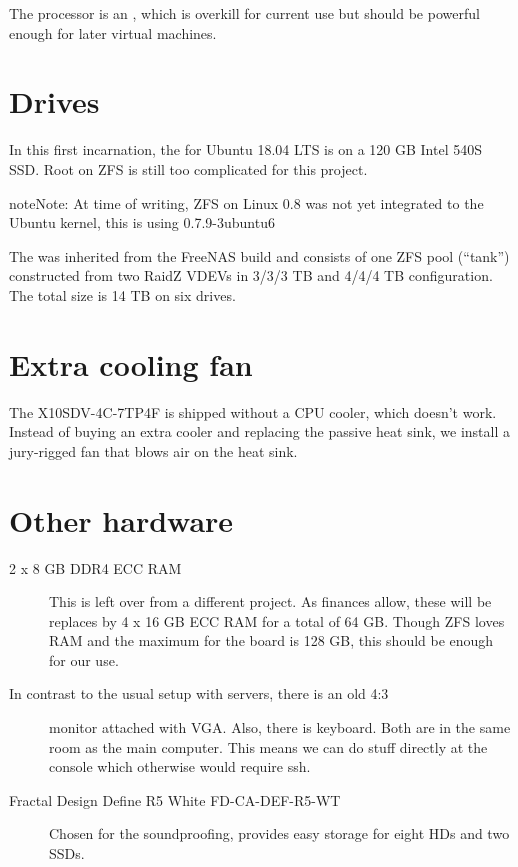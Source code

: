 \documentclass[a4paper,10pt,english]{sphinxmanual}
\begin{document}
The processor is an , which is overkill
for current use but should be powerful enough for later virtual machines.


\section{Drives}
\label{\detokenize{hardware:drives}}
In this first incarnation, the  for Ubuntu 18.04 LTS is
on a 120 GB Intel 540S SSD. Root on ZFS is still too complicated for this
project.

\begin{sphinxadmonition}{note}{Note:}
At time of writing, ZFS on Linux 0.8 was not yet integrated to the
Ubuntu kernel, this is using 0.7.9-3ubuntu6
\end{sphinxadmonition}

The  was inherited from the FreeNAS build and consists of one
ZFS pool (“tank”) constructed from two RaidZ VDEVs in 3/3/3 TB and 4/4/4 TB
configuration. The total size is 14 TB on six drives.


\section{Extra cooling fan}
\label{\detokenize{hardware:extra-cooling-fan}}
The X10SDV-4C-7TP4F is shipped without a CPU cooler, which doesn’t work. Instead
of buying an extra cooler and replacing the passive heat sink, we install a
jury-rigged fan that blows air on the heat sink.


\section{Other hardware}
\label{\detokenize{hardware:other-hardware}}\begin{description}
\item[{ 2 x 8 GB DDR4 ECC RAM}] \leavevmode
This is left over from a different project. As finances allow, these
will be replaces by 4 x 16 GB ECC RAM for a total of 64 GB. Though ZFS
loves RAM and the maximum for the board is 128 GB, this should be enough
for our use.

\item[{ In contrast to the usual setup with servers, there is an old 4:3}] \leavevmode
monitor attached with VGA. Also, there is keyboard. Both are in the same
room as the main computer. This means we can do stuff directly at the
console which otherwise would require ssh.

\item[{ Fractal Design Define R5 White FD-CA-DEF-R5-WT}] \leavevmode
Chosen for the soundproofing, provides easy storage for eight HDs and
two SSDs.

\end{description}
\end{document}
